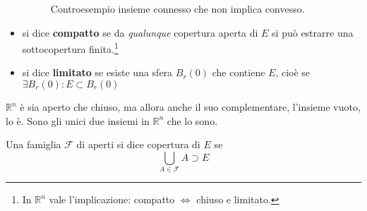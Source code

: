\documentclass[10pt,a4paper,twoside,openright]{book}
\begin{document}
\begin{itemize}
\begin{figure}[htpb]
	\caption{Controesempio insieme connesso che non implica convesso.}
\end{figure}
\FloatBarrier
\item si dice \textbf{compatto} se da \textit{qualunque} copertura aperta di $E$ si può estrarre una sottocopertura finita.\footnote{In $\mathbb{R}^{n}$ vale l'implicazione: compatto $\Leftrightarrow$ chiuso e limitato.}
\item si dice \textbf{limitato} se esiste una sfera $B_{r}(0)$ che contiene $E$, cioè se $\exists B_{r}(0) :E\subset B_{r}(0)$
\end{itemize}
\begin{nb}
$\mathbb{R}^{n}$ è sia aperto che chiuso, ma allora anche il suo complementare, l'insieme vuoto, lo è. Sono gli unici due insiemi in $\mathbb{R}^{n}$ che lo sono.
\end{nb}
\begin{definition}
[Copertura] Una famiglia $\mathcal{F}$ di aperti si dice copertura di $E$ se
\begin{equation*}
\bigcup _{A\in \mathcal{F}} A\supset E
\end{equation*}
\end{definition}
\end{document}
